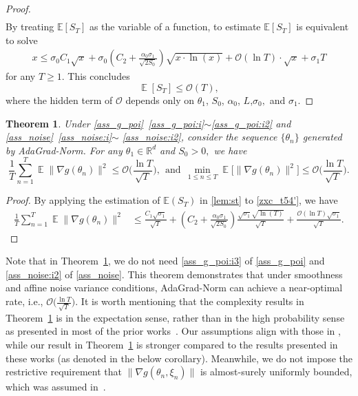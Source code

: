 \documentclass[standalone]{article}
\newcommand{\E}{\mathbb{E}}
\newtheorem{thm}{Theorem}[section]
\DeclareMathOperator{\Expect}{\mathbb{E}}
\begin{document}
\begin{proof}
\begin{equation}
\begin{aligned}
\end{aligned}\end{equation}
By treating $\E[S_T]$ as the variable of a function, to estimate $\E[S_T]$ is equivalent to solve
\begin{align}
x \leq \sigma_0C_1\sqrt{x}+ \sigma_0\left(C_2 + \frac{\alpha_0\sigma_1}{\sqrt{2S_0}}\right)\sqrt{x\cdot \ln(x)}+\mathcal{O}({\ln T})\cdot\sqrt{x}+ \sigma_1 T
\end{align}
for any $T \geq 1$. This concludes  
$$\Expect[S_{T}] \leq \mathcal{O}(T), $$ 
where the hidden term of $\mathcal{O}$  depends only on $\theta_{1}$, $S_{0}$, $\alpha_{0}$, $ L$,$\sigma_{0},$ and $\sigma_{1}.$  
\end{proof}

\begin{thm}\label{convergence_rate_0}
Under \cref{ass_g_poi}~\ref{ass_g_poi:i}$\sim$\ref{ass_g_poi:i2} and  \cref{ass_noise}~\ref{ass_noise:i}$\sim$ \ref{ass_noise:i2}, consider the sequence $\{\theta_{n}\}$ generated by AdaGrad-Norm. For any $\theta_{1}\in \mathbb{R}^{d}$ and $S_{0}>0,$ we have
$$\frac{1}{T}\sum_{n=1}^{T}{\Expect\big\|\nabla g(\theta_{n})\big\|^{2}} \leq \mathcal{O}\bigg(\frac{\ln T}{\sqrt{T}}\bigg),\ \ \text{and}\ \ \min_{1\le n\le T}\Expect\big[\|\nabla g(\theta_{n})\|^{2}\big] \leq \mathcal{O}\bigg(\frac{\ln T}{\sqrt{T}}\bigg).$$ 
\end{thm}
\begin{proof}%
By applying the estimation of $\E(S_T)$ in \cref{lem:st} to \cref{zxc_t54'}, we have
\begin{align*}
\frac{1}{T}\sum_{n=1}^{T}\Expect\|\nabla g(\theta_{n})\|^{2}&\le \frac{C_1\sqrt{\sigma_1}}{\sqrt{T}} + \left(C_2 + \frac{\alpha_0\sigma_1}{\sqrt{2S_0}}\right)\frac{\sqrt{\sigma_1}\sqrt{\ln(T)}}{\sqrt{T}}+\frac{\mathcal{O}({\ln T})\sqrt{\sigma_1}}{\sqrt{T}}. 
\end{align*}  
\end{proof}
Note that in Theorem~\ref{convergence_rate_0}, we do not need \cref{ass_g_poi:i3} of \cref{ass_g_poi}  and \cref{ass_noise:i2} of \cref{ass_noise}.  This theorem demonstrates that under smoothness and affine noise variance conditions, AdaGrad-Norm can achieve a near-optimal rate, i.e., $\mathcal{O}\big(\frac{\ln T}{\sqrt{T}}\big).$ It is worth mentioning that the complexity results in Theorem~\ref{convergence_rate_0} is in the expectation sense, rather than in the high probability sense as presented in most of the prior works~\citep{li2020high,defossez2020simple,kavis2022high,liu2022convergence,faw2022power,wang2023convergence}. Our assumptions align with those in \cite{faw2022power,wang2023convergence}, while our result in Theorem~\ref{convergence_rate_0} is stronger compared to the results presented in these works (as denoted in the below corollary).
Meanwhile, we do not impose the restrictive requirement that $\|\nabla g(\theta_{n},\xi_{n})\|$ is almost-surely uniformly bounded, which was assumed in~\cite{ward2020adagrad}. 
\end{document}
